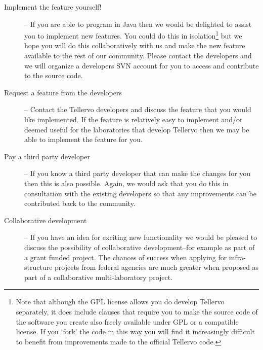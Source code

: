 \begin{description}
 \item[Implement the feature yourself!] -- If you are able to program in Java then we would be delighted to assist you to implement new features.  You could do this in isolation\footnote{Note that although the GPL license allows you do develop Tellervo separately, it does include clauses that require you to make the source code of the software you create also freely available under GPL or a compatible license. If you `fork' the code in this way you will find it increasingly difficult to benefit from improvements made to the official Tellervo code.} but we hope you will do this collaboratively with us and make the new feature available to the rest of our community.  Please contact the developers and we will organize a developers SVN account for you to access and contribute to the source code.
 \item[Request a feature from the developers] -- Contact the Tellervo developers and discuss the feature that you would like implemented.  If the feature is relatively easy to implement and/or deemed useful for the laboratories that develop Tellervo then we may be able to implement the feature for you.
 \item[Pay a third party developer] -- If you know a third party developer that can make the changes for you then this is also possible.  Again, we would ask that you do this in consultation with the existing developers so that any improvements can be contributed back to the community.
 \item[Collaborative development] -- If you have an idea for exciting new functionality we would be pleased to discuss the possibility of collaborative development--for example as part of a grant funded project.  The chances of success when applying for infra-structure projects from federal agencies are much greater when proposed as part of a collaborative multi-laboratory project.
\end{description}


